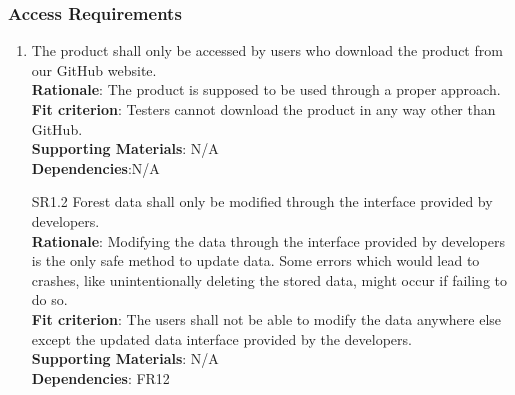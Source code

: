 \documentclass{article}
\begin{document}
\subsubsection{Access Requirements}
\begin{enumerate}[SR1.1]
    \item The product shall only be accessed by users who download the product from our
     GitHub website.\\
    \textbf{Rationale}: The product is supposed to be used through a proper approach.\\
    \textbf{Fit criterion}: Testers cannot download the product in any way other than GitHub.\\
\textbf{Supporting Materials}: N/A\\
\textbf{Dependencies}:N/A\\
    
    \item[SR1.2]Forest
    data shall only be modified through the interface provided by developers.\\
    \textbf{Rationale}: Modifying the data through the interface provided by developers is the only safe method to update data. Some errors which would lead to crashes, like unintentionally deleting the stored data, might occur if failing to do so.\\
    \textbf{Fit criterion}: The users shall not be able to modify the data anywhere else except the updated data interface provided by the developers.\\
\textbf{Supporting Materials}: N/A\\
\textbf{Dependencies}: FR12\\

\end{enumerate}
\end{document}
